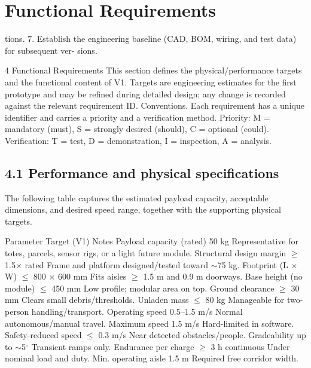 \chapter{Functional Requirements}

tions. 7. Establish the engineering baseline (CAD, BOM, wiring, and test data) for subsequent ver- sions.

4 Functional Requirements This section defines the physical/performance targets and the functional content of V1. Targets are engineering estimates for the first prototype and may be refined during detailed design; any change is recorded against the relevant requirement ID. Conventions. Each requirement has a unique identifier and carries a priority and a verification method. Priority: M = mandatory (must), S = strongly desired (should), C = optional (could). Verification: T = test, D = demonstration, I = inspection, A = analysis.

\section*{4.1 Performance and physical specifications}

The following table captures the estimated payload capacity, acceptable dimensions, and desired speed range, together with the supporting physical targets.

Parameter                        Target (V1)                    Notes Payload capacity (rated)         50 kg                          Representative for totes, parcels, sensor rigs, or a light future module. Structural design margin         $\geq$ 1.5$\times$ rated                   Frame and platform designed/tested toward $\sim$75 kg. Footprint (L $\times$ W)                $\leq$ 800 $\times$ 600 mm                 Fits aisles $\geq$ 1.5 m and 0.9 m doorways. Base height (no module)          $\leq$ 450 mm                       Low profile; modular area on top. Ground clearance                 $\geq$ 30 mm                        Clears small debris/thresholds. Unladen mass                     $\leq$ 80 kg                        Manageable for two-person handling/transport. Operating speed                  0.5--1.5 m/s                    Normal autonomous/manual travel. Maximum speed                    1.5 m/s                        Hard-limited in software. Safety-reduced speed             $\leq$ 0.3 m/s                      Near detected obstacles/people. Gradeability                     up to $\sim$5$^\circ$                      Transient ramps only. Endurance per charge             $\geq$ 3 h continuous               Under nominal load and duty. Min. operating aisle             1.5 m                          Required free corridor width.

